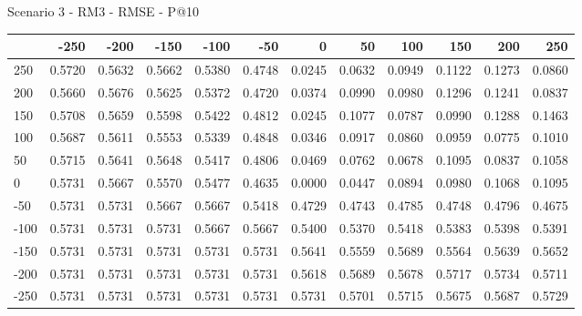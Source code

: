Scenario 3 - RM3 - RMSE - P@10
\begin{tabular}{lrrrrrrrrrrr}
\toprule
{} &   -250 &   -200 &   -150 &   -100 &   -50  &    0   &    50  &    100 &    150 &    200 &    250 \\
\midrule
 250 & 0.5720 & 0.5632 & 0.5662 & 0.5380 & 0.4748 & 0.0245 & 0.0632 & 0.0949 & 0.1122 & 0.1273 & 0.0860 \\
 200 & 0.5660 & 0.5676 & 0.5625 & 0.5372 & 0.4720 & 0.0374 & 0.0990 & 0.0980 & 0.1296 & 0.1241 & 0.0837 \\
 150 & 0.5708 & 0.5659 & 0.5598 & 0.5422 & 0.4812 & 0.0245 & 0.1077 & 0.0787 & 0.0990 & 0.1288 & 0.1463 \\
 100 & 0.5687 & 0.5611 & 0.5553 & 0.5339 & 0.4848 & 0.0346 & 0.0917 & 0.0860 & 0.0959 & 0.0775 & 0.1010 \\
 50  & 0.5715 & 0.5641 & 0.5648 & 0.5417 & 0.4806 & 0.0469 & 0.0762 & 0.0678 & 0.1095 & 0.0837 & 0.1058 \\
 0   & 0.5731 & 0.5667 & 0.5570 & 0.5477 & 0.4635 & 0.0000 & 0.0447 & 0.0894 & 0.0980 & 0.1068 & 0.1095 \\
-50  & 0.5731 & 0.5731 & 0.5667 & 0.5667 & 0.5418 & 0.4729 & 0.4743 & 0.4785 & 0.4748 & 0.4796 & 0.4675 \\
-100 & 0.5731 & 0.5731 & 0.5731 & 0.5667 & 0.5667 & 0.5400 & 0.5370 & 0.5418 & 0.5383 & 0.5398 & 0.5391 \\
-150 & 0.5731 & 0.5731 & 0.5731 & 0.5731 & 0.5731 & 0.5641 & 0.5559 & 0.5689 & 0.5564 & 0.5639 & 0.5652 \\
-200 & 0.5731 & 0.5731 & 0.5731 & 0.5731 & 0.5731 & 0.5618 & 0.5689 & 0.5678 & 0.5717 & 0.5734 & 0.5711 \\
-250 & 0.5731 & 0.5731 & 0.5731 & 0.5731 & 0.5731 & 0.5731 & 0.5701 & 0.5715 & 0.5675 & 0.5687 & 0.5729 \\
\bottomrule
\end{tabular}

